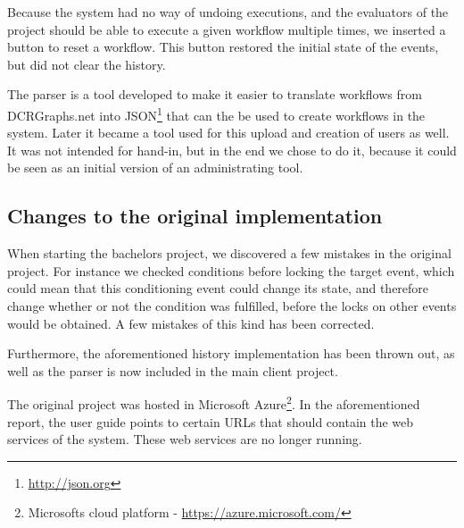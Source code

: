 		\newpar Because the system had no way of undoing executions, and the evaluators of the project should be able to execute a given workflow multiple times, we inserted a button to reset a workflow. This button restored the initial state of the events, but did not clear the history.
		
		\newpar The parser is a tool developed to make it easier to translate workflows from DCRGraphs.net into JSON\footnote{\url{http://json.org}} that can the be used to create workflows in the system. Later it became a tool used for this upload and creation of users as well. It was not intended for hand-in, but in the end we chose to do it, because it could be seen as an initial version of an administrating tool.
		
		\subsection{Changes to the original implementation}
			When starting the bachelors project, we discovered a few mistakes in the original project. For instance we checked conditions before locking the target event, which could mean that this conditioning event could change its state, and therefore change whether or not the condition was fulfilled, before the locks on other events would be obtained. A few mistakes of this kind has been corrected.
			
			\newpar Furthermore, the aforementioned history implementation has been thrown out, as well as the parser is now included in the main client project.

			\newpar The original project was hosted in Microsoft Azure\footnote{Microsofts cloud platform - \url{https://azure.microsoft.com/}}. In the aforementioned report, the user guide points to certain URLs that should contain the web services of the system. These web services are no longer running.